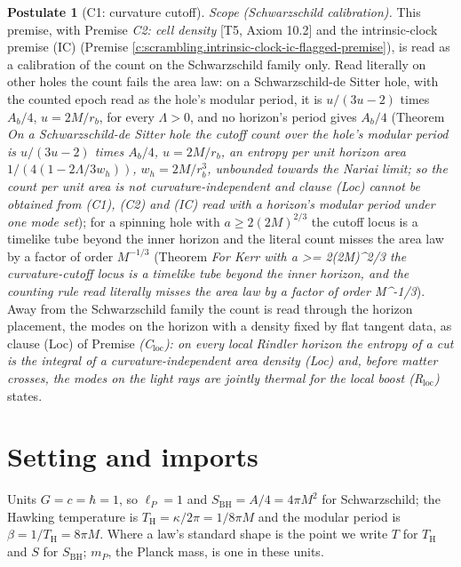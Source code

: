 \documentclass[11pt]{article}
\theoremstyle{definition}
\newtheorem{postulate}[theorem]{Postulate}
\theoremstyle{plain}
\providecommand{\SBH}{}\renewcommand{\SBH}{S_{\mathrm{BH}}}
\providecommand{\TH}{}\renewcommand{\TH}{T_{\mathrm{H}}}
\providecommand{\lP}{}\renewcommand{\lP}{\ell_{P}}
\begin{document}
\begin{postulate}[C1: curvature cutoff]
\emph{Scope (Schwarzschild calibration).} This premise, with Premise \emph{C2: cell density} [T5, Axiom 10.2] and the intrinsic-clock premise (IC) (Premise \ref{c:scrambling.intrinsic-clock-ic-flagged-premise}), is read as a calibration of the count on the Schwarzschild family only. Read literally on other holes the count fails the area law: on a Schwarzschild-de Sitter hole, with the counted epoch read as the hole's modular period, it is $u/(3u - 2)$ times $A_{b}/4$, $u = 2M/r_{b}$, for every $\Lambda > 0$, and no horizon's period gives $A_{b}/4$ (Theorem \emph{On a Schwarzschild-de Sitter hole the cutoff count over the hole's modular period is $u/(3u - 2)$ times $A_{b}/4$, $u = 2M/r_{b}$, an entropy per unit horizon area $1/(4(1 - 2\Lambda/3w_{h}))$, $w_{h} = 2M/r_{b}^{3}$, unbounded towards the Nariai limit; so the count per unit area is not curvature-independent and clause (Loc) cannot be obtained from (C1), (C2) and (IC) read with a horizon's modular period under one mode set}); for a spinning hole with $a \ge 2(2M)^{2/3}$ the cutoff locus is a timelike tube beyond the inner horizon and the literal count misses the area law by a factor of order $M^{-1/3}$ (Theorem \emph{For Kerr with a >= 2(2M)\^{}{2/3} the curvature-cutoff locus is a timelike tube beyond the inner horizon, and the counting rule read literally misses the area law by a factor of order M\^{}{-1/3}}). Away from the Schwarzschild family the count is read through the horizon placement, the modes on the horizon with a density fixed by flat tangent data, as clause (Loc) of Premise \emph{(C$_{\mathrm{loc}}$): on every local Rindler horizon the entropy of a cut is the integral of a curvature-independent area density (Loc) and, before matter crosses, the modes on the light rays are jointly thermal for the local boost (R$_{\mathrm{loc}}$)} states.
\end{postulate}

\section{Setting and imports}

\label{c:note.scrambling.setting-setting-imports}
Units $G = c = \hbar = 1$, so $\lP = 1$ and $\SBH = A/4 = 4\pi M^2$ for Schwarzschild; the Hawking temperature is $\TH = \kappa/2\pi = 1/8\pi M$ and the modular period is $\beta = 1/\TH = 8\pi M$. Where a law's standard shape is the point we write $T$ for $\TH$ and $S$ for $\SBH$; $m_P$, the Planck mass, is one in these units.
\end{document}
